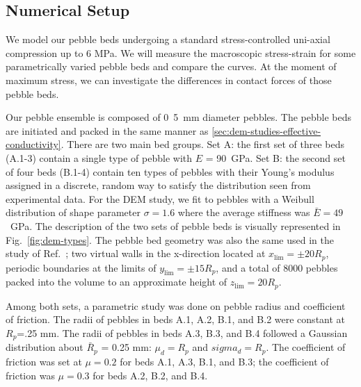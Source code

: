 \subsection{Numerical Setup}
We model our pebble beds undergoing a standard stress-controlled uni-axial compression up to 6 MPa. We will measure the macroscopic stress-strain for some parametrically varied pebble beds and compare the curves. At the moment of maximum stress, we can investigate the differences in contact forces of those pebble beds.

Our pebble ensemble is composed of \si{0.5 mm} diameter \lis pebbles. The pebble beds are initiated and packed in the same manner as \cref{sec:dem-studies-effective-conductivity}. There are two main bed groups. Set A: the first set of three beds (A.1-3) contain a single type of pebble with $E$ = \si{90 GPa}. Set B: the second set of four beds (B.1-4) contain ten types of pebbles with their Young's modulus assigned in a discrete, random way to satisfy the distribution seen from experimental data. For the DEM study, we fit to \lis pebbles with a Weibull distribution of shape parameter $\sigma = 1.6$ where the average stiffness was $\bar{E} = 49$~GPa. The description of the two sets of pebble beds is visually represented in Fig.~\ref{fig:dem-types}. The pebble bed geometry was also the same used in the study of Ref.~\cite{VanLew2014}; two virtual walls in the x-direction located at $x_\text{lim} = \pm 20 R_p$, periodic boundaries at the limits of $y_\text{lim} = \pm 15 R_p$, and a total of 8000 pebbles packed into the volume to an approximate height of $z_\text{lim} = 20 R_p$.

Among both sets, a parametric study was done on pebble radius and coefficient of friction. The radii of pebbles in beds A.1, A.2, B.1, and B.2 were constant at $R_p$=.25 mm. The radii of pebbles in beds A.3, B.3, and B.4 followed a Gaussian distribution about $\bar{R}_p$ = 0.25 mm: $\mu_d = R_p$ and $sigma_d = R_p$. The coefficient of friction was set at $\mu = 0.2$ for beds A.1, A.3, B.1, and B.3; the coefficient of friction was $\mu = 0.3$ for beds A.2, B.2, and B.4.


